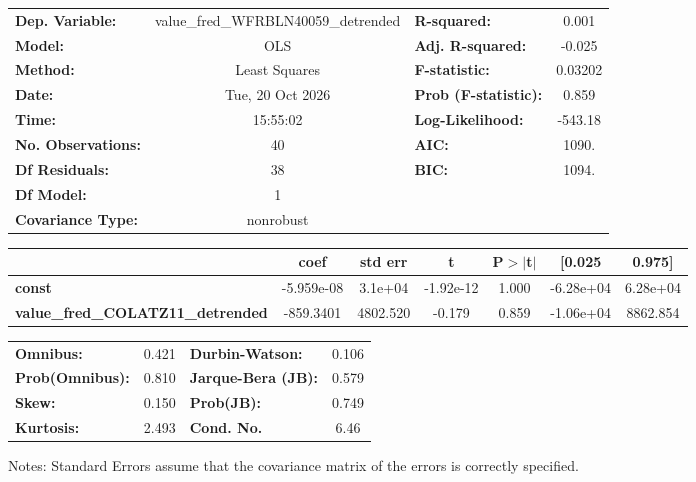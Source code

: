 \begin{center}
\begin{tabular}{lclc}
\toprule
\textbf{Dep. Variable:}                   & value\_fred\_WFRBLN40059\_detrended & \textbf{  R-squared:         } &     0.001   \\
\textbf{Model:}                           &                 OLS                 & \textbf{  Adj. R-squared:    } &    -0.025   \\
\textbf{Method:}                          &            Least Squares            & \textbf{  F-statistic:       } &   0.03202   \\
\textbf{Date:}                            &           Tue, 20 Oct 2026          & \textbf{  Prob (F-statistic):} &    0.859    \\
\textbf{Time:}                            &               15:55:02              & \textbf{  Log-Likelihood:    } &   -543.18   \\
\textbf{No. Observations:}                &                    40               & \textbf{  AIC:               } &     1090.   \\
\textbf{Df Residuals:}                    &                    38               & \textbf{  BIC:               } &     1094.   \\
\textbf{Df Model:}                        &                     1               & \textbf{                     } &             \\
\textbf{Covariance Type:}                 &              nonrobust              & \textbf{                     } &             \\
\bottomrule
\end{tabular}
\begin{tabular}{lcccccc}
                                          & \textbf{coef} & \textbf{std err} & \textbf{t} & \textbf{P$> |$t$|$} & \textbf{[0.025} & \textbf{0.975]}  \\
\midrule
\textbf{const}                            &   -5.959e-08  &      3.1e+04     & -1.92e-12  &         1.000        &    -6.28e+04    &     6.28e+04     \\
\textbf{value\_fred\_COLATZ11\_detrended} &    -859.3401  &     4802.520     &    -0.179  &         0.859        &    -1.06e+04    &     8862.854     \\
\bottomrule
\end{tabular}
\begin{tabular}{lclc}
\textbf{Omnibus:}       &  0.421 & \textbf{  Durbin-Watson:     } &    0.106  \\
\textbf{Prob(Omnibus):} &  0.810 & \textbf{  Jarque-Bera (JB):  } &    0.579  \\
\textbf{Skew:}          &  0.150 & \textbf{  Prob(JB):          } &    0.749  \\
\textbf{Kurtosis:}      &  2.493 & \textbf{  Cond. No.          } &     6.46  \\
\bottomrule
\end{tabular}
\end{center}

Notes: \newline
 [1] Standard Errors assume that the covariance matrix of the errors is correctly specified.